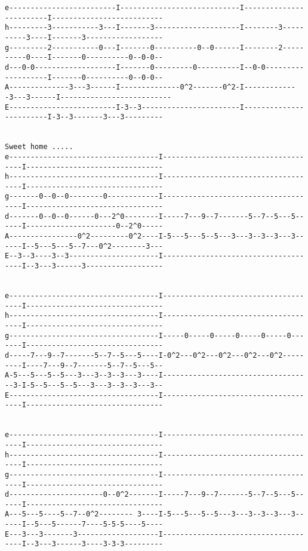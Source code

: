 \begin{verbatim}
e-------------------------I----------------------------I------------------------I--------------------------
h---------3-----------3---I-------3--------------------I--------3----------3----I-------3------------------
g---------2-----------0---I-------0----------0--0------I--------2----------0----I-------0----------0--0-0--
d---0-0-------------------I-------0---------0----------I--0-0-------------------I-------0----------0--0-0--
A--------------3---3------I--------------0^2-------0^2-I-------------3---3------I--------------------------
E-------------------------I-3--3-----------------------I------------------------I-3--3-------3---3---------


Sweet home .....
e-----------------------------------I-------------------------------------I--------------------------------
h-----------------------------------I-------------------------------------I--------------------------------
g-------0--0--0--------0------------I-------------------------------------I--------------------------------
d-------0--0--0------0---2^0--------I-----7---9--7-------5--7--5---5------I---------------------0--2^0-----
A----------------0^2---------0^2----I-5---5---5--5---3---3--3--3---3------I--5---5---5--7---0^2--------3---
E--3--3----3--3---------------------I-------------------------------------I--3---3------3------------------


e-----------------------------------I-------------------------------------I--------------------------------
h-----------------------------------I-------------------------------------I--------------------------------
g-----------------------------------I-----0-----0-----0-----0-----0-------I--------------------------------
d-----7---9--7-------5--7--5---5----I-0^2---0^2---0^2---0^2---0^2---------I----7---9--7-------5--7--5---5--
A-5---5---5--5---3---3--3--3---3----I-----------------------------------3-I-5--5---5--5---3---3--3--3---3--
E-----------------------------------I-------------------------------------I--------------------------------


e-----------------------------------I-------------------------------------I--------------------------------
h-----------------------------------I-------------------------------------I--------------------------------
g-----------------------------------I-------------------------------------I--------------------------------
d----------------------0--0^2-------I-----7---9--7-------5--7--5---5------I--------------------------------
A---5---5----5--7--0^2-------- 3----I-5---5---5--5---3---3--3--3---3------I--5---5------7----5-5-5----5----
E---3---3-------3-------------------I-------------------------------------I--3---3------3----3-3-3---------



\end{verbatim}
